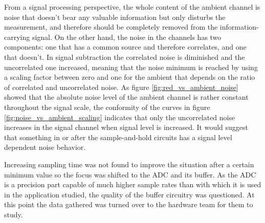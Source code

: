 From a signal processing perspective, the whole content of the ambient channel is noise that doesn't bear any valuable information but only disturbs the measurement, and therefore should be completely removed from the information-carrying signal. On the other hand, the noise in the channels has two components: one that has a common source and therefore correlates, and one that doesn't. In signal subtraction the correlated noise is diminished and the uncorrelated one increased, meaning that the noise minimum is reached by using a scaling factor between zero and one for the ambient that depends on the ratio of correlated and uncorrelated noise. As figure \ref{fig:red_vs_ambient_noise} showed that the absolute noise level of the ambient channel is rather constant throughout the signal scale, the conformity of the curves in figure \ref{fig:noise_vs_ambient_scaling} indicates that only the uncorrelated noise increases in the signal channel when signal level is increased. It would suggest that something in or after the sample-and-hold circuits has a signal level dependent noise behavior.

Increasing sampling time was not found to improve the situation after a certain minimum value so the focus was shifted to the ADC and its buffer. As the ADC is a precision part capable of much higher sample rates than with which it is used in the application studied, the quality of the buffer circuitry was questioned. At this point the data gathered was turned over to the hardware team for them to study.


